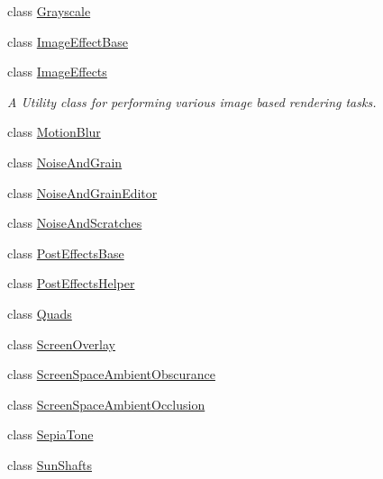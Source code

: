 \begin{DoxyCompactItemize}
\item 
class \mbox{\hyperlink{class_unity_standard_assets_1_1_image_effects_1_1_grayscale}{Grayscale}}
\item 
class \mbox{\hyperlink{class_unity_standard_assets_1_1_image_effects_1_1_image_effect_base}{Image\+Effect\+Base}}
\item 
class \mbox{\hyperlink{class_unity_standard_assets_1_1_image_effects_1_1_image_effects}{Image\+Effects}}
\begin{DoxyCompactList}\small\item\em A Utility class for performing various image based rendering tasks. \end{DoxyCompactList}\item 
class \mbox{\hyperlink{class_unity_standard_assets_1_1_image_effects_1_1_motion_blur}{Motion\+Blur}}
\item 
class \mbox{\hyperlink{class_unity_standard_assets_1_1_image_effects_1_1_noise_and_grain}{Noise\+And\+Grain}}
\item 
class \mbox{\hyperlink{class_unity_standard_assets_1_1_image_effects_1_1_noise_and_grain_editor}{Noise\+And\+Grain\+Editor}}
\item 
class \mbox{\hyperlink{class_unity_standard_assets_1_1_image_effects_1_1_noise_and_scratches}{Noise\+And\+Scratches}}
\item 
class \mbox{\hyperlink{class_unity_standard_assets_1_1_image_effects_1_1_post_effects_base}{Post\+Effects\+Base}}
\item 
class \mbox{\hyperlink{class_unity_standard_assets_1_1_image_effects_1_1_post_effects_helper}{Post\+Effects\+Helper}}
\item 
class \mbox{\hyperlink{class_unity_standard_assets_1_1_image_effects_1_1_quads}{Quads}}
\item 
class \mbox{\hyperlink{class_unity_standard_assets_1_1_image_effects_1_1_screen_overlay}{Screen\+Overlay}}
\item 
class \mbox{\hyperlink{class_unity_standard_assets_1_1_image_effects_1_1_screen_space_ambient_obscurance}{Screen\+Space\+Ambient\+Obscurance}}
\item 
class \mbox{\hyperlink{class_unity_standard_assets_1_1_image_effects_1_1_screen_space_ambient_occlusion}{Screen\+Space\+Ambient\+Occlusion}}
\item 
class \mbox{\hyperlink{class_unity_standard_assets_1_1_image_effects_1_1_sepia_tone}{Sepia\+Tone}}
\item 
class \mbox{\hyperlink{class_unity_standard_assets_1_1_image_effects_1_1_sun_shafts}{Sun\+Shafts}}

\end{DoxyCompactItemize}
